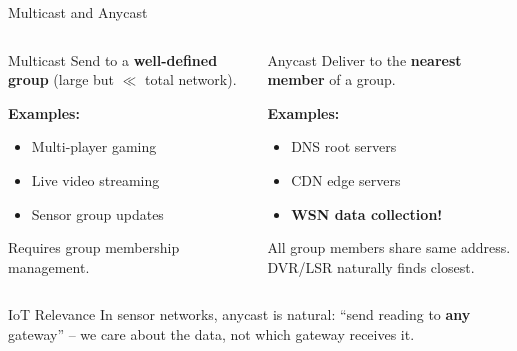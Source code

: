 \documentclass[aspectratio=169,11pt]{beamer}
\begin{document}
\begin{frame}{Multicast and Anycast}
    \begin{columns}
        \begin{block}{Multicast}
            Send to a \textbf{well-defined group} (large but $\ll$ total network).
            
            \vspace{0.2cm}
            \textbf{Examples:}
            \begin{itemize}
                \item Multi-player gaming
                \item Live video streaming
                \item Sensor group updates
            \end{itemize}
            
            \vspace{0.2cm}
            Requires group membership management.
        \end{block}
        
        \begin{block}{Anycast}
            Deliver to the \textbf{nearest member} of a group.
            
            \vspace{0.2cm}
            \textbf{Examples:}
            \begin{itemize}
                \item DNS root servers
                \item CDN edge servers
                \item \textbf{WSN data collection!}
            \end{itemize}
            
            \vspace{0.2cm}
            All group members share same address. DVR/LSR naturally finds closest.
        \end{block}
    \end{columns}
    
    \vspace{0.3cm}
    \begin{alertblock}{IoT Relevance}
        In sensor networks, anycast is natural: ``send reading to \textbf{any} gateway'' -- we care about the data, not which gateway receives it.
    \end{alertblock}
\end{frame}
\end{document}
